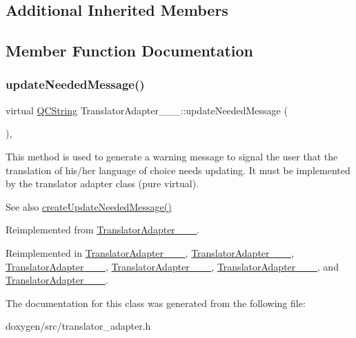\subsection*{Additional Inherited Members}


\subsection{Member Function Documentation}
\mbox{\label{class_translator_adapter__1__8__2_a307747456f69ab8dcb0c2be27f429e80}} 
\subsubsection{\texorpdfstring{updateNeededMessage()}{updateNeededMessage()}}
{\footnotesize\ttfamily virtual \mbox{\hyperlink{class_q_c_string}{Q\+C\+String}} Translator\+Adapter\+\_\+\_\+\_\+::update\+Needed\+Message (\begin{DoxyParamCaption}{ }\end{DoxyParamCaption})\hspace{0.3cm}{\ttfamily [inline]}, {\ttfamily [virtual]}}

This method is used to generate a warning message to signal the user that the translation of his/her language of choice needs updating. It must be implemented by the translator adapter class (pure virtual).

\begin{DoxySeeAlso}{See also}
\mbox{\hyperlink{class_translator_adapter_base_a71493b87a34d6e4c232e540734aba698}{create\+Update\+Needed\+Message()}} 
\end{DoxySeeAlso}


Reimplemented from \mbox{\hyperlink{class_translator_adapter__1__8__4_a87dbcf9a99bf2ddfd9593461d331b714}{Translator\+Adapter\+\_\+\_\+\_}}.



Reimplemented in \mbox{\hyperlink{class_translator_adapter__1__4__6_ab19b01d4e00c95ef1e6eb631fbe6ada4}{Translator\+Adapter\+\_\+\_\+\_}}, \mbox{\hyperlink{class_translator_adapter__1__5__4_a587a31dad925e47f206b6a0cda9eedd0}{Translator\+Adapter\+\_\+\_\+\_}}, \mbox{\hyperlink{class_translator_adapter__1__6__0_abc231eb2c1864ca9f878e7e5deb94f54}{Translator\+Adapter\+\_\+\_\+\_}}, \mbox{\hyperlink{class_translator_adapter__1__6__3_ab3d79abfb926c41bd7609eeb706654fe}{Translator\+Adapter\+\_\+\_\+\_}}, \mbox{\hyperlink{class_translator_adapter__1__7__5_a6e69d48e79a13c9d934f9af1a8befd8a}{Translator\+Adapter\+\_\+\_\+\_}}, and \mbox{\hyperlink{class_translator_adapter__1__8__0_a47cedb130d9a178d9c632584d4f2abec}{Translator\+Adapter\+\_\+\_\+\_}}.



The documentation for this class was generated from the following file\+:\begin{DoxyCompactItemize}
\item 
doxygen/src/translator\+\_\+adapter.\+h\end{DoxyCompactItemize}
